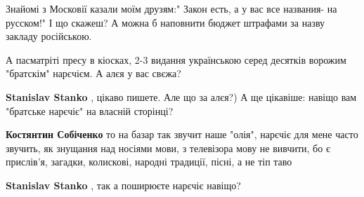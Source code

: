 \begin{itemize}
 

Знайомі з Московії казали моїм друзям:" Закон есть, а у вас все названия- на
русском!" І що скажеш? А можна б наповнити бюджет штрафами за назву закладу
російською.


 
А пасматріті пресу в кіосках, 2-3 видання українською серед десятків ворожим
"братскім" нарєчієм. А алєя у вас свєжа?

\begin{itemize}
 
\textbf{Stanislav Stanko} , цікаво пишете. Але що за алєя?) А ще цікавіше: навіщо вам "братське нарєчіє" на власній сторінці?

\begin{itemize}
 
\textbf{Костянтин Собіченко} то на базар так звучит наше "олія", нарєчіє для мене часто звучить, як знущання над носіями мови, з телевізора мову не вивчити, бо є прислів'я, загадки, колискові, народні традиції, пісні, а не тіп таво

 
\textbf{Stanislav Stanko} , так а поширюєте нарєчіє навіщо?
\end{itemize}

\end{itemize}


\end{itemize}
